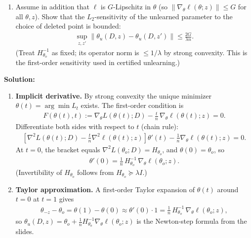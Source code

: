 \documentclass[12pt]{article}
\begin{document}
\begin{enumerate}
\begin{enumerate}
    \item Assume in addition that $\ell$ is $G$-Lipschitz in $\theta$ (so $\|\nabla_\theta \ell(\theta; z)\| \le G$ for all $\theta, z$). Show that the $L_2$-sensitivity of the unlearned parameter to the choice of deleted point is bounded:
    \begin{align*}
        \sup_{z, z'} \|\theta_u(D, z) - \theta_u(D, z')\| \le \frac{2 G}{\lambda n}.
    \end{align*}
    (Treat $H_{\theta_o}^{-1}$ as fixed; its operator norm is $\le 1/\lambda$ by strong convexity. This is the first-order sensitivity used in certified unlearning.)
\end{enumerate}

\begin{solution}
{\bf Solution:}\\
\begin{enumerate}
    \item \textbf{Implicit derivative.} By strong convexity the unique minimizer $\theta(t) = \arg\min L_t$ exists. The first-order condition is
    \begin{align*}
        F(\theta(t), t) := \nabla_\theta L(\theta(t); D) - \frac{t}{n}\,\nabla_\theta \ell(\theta(t); z) = 0.
    \end{align*}
    Differentiate both sides with respect to $t$ (chain rule):
    \begin{align*}
        \left[\nabla^2 L(\theta(t); D) - \frac{t}{n}\nabla^2 \ell(\theta(t); z)\right]\theta'(t) - \frac{1}{n}\nabla_\theta \ell(\theta(t); z) = 0.
    \end{align*}
    At $t = 0$, the bracket equals $\nabla^2 L(\theta_o; D) = H_{\theta_o}$, and $\theta(0) = \theta_o$, so
    \begin{align*}
        \theta'(0) = \frac{1}{n}\, H_{\theta_o}^{-1}\, \nabla_\theta \ell(\theta_o; z).
    \end{align*}
    (Invertibility of $H_{\theta_o}$ follows from $H_{\theta_o} \succeq \lambda I$.)

    \item \textbf{Taylor approximation.} A first-order Taylor expansion of $\theta(t)$ around $t = 0$ at $t = 1$ gives
    \begin{align*}
        \theta_{-z} - \theta_o = \theta(1) - \theta(0) \approx \theta'(0) \cdot 1 = \frac{1}{n}\, H_{\theta_o}^{-1}\, \nabla_\theta \ell(\theta_o; z),
    \end{align*}
    so $\theta_u(D, z) = \theta_o + \frac{1}{n}H_{\theta_o}^{-1}\nabla_\theta \ell(\theta_o; z)$ is the Newton-step formula from the slides.


\end{enumerate}
\end{solution}
\end{enumerate}
\end{document}
